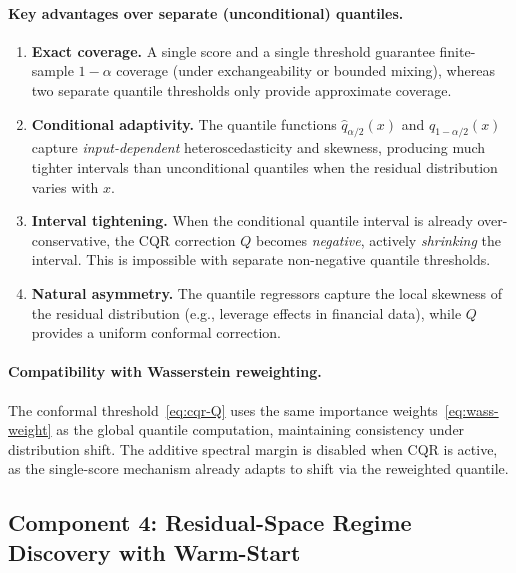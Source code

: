 \paragraph{Key advantages over separate (unconditional) quantiles.}
\begin{enumerate}
  \item \textbf{Exact coverage.}  A single score and a single threshold
    guarantee finite-sample $1-\alpha$ coverage (under exchangeability or
    bounded mixing), whereas two separate quantile thresholds only provide
    approximate coverage.
  \item \textbf{Conditional adaptivity.}  The quantile functions
    $\hat{q}_{\alpha/2}(x)$ and $\hat{q}_{1-\alpha/2}(x)$ capture
    \emph{input-dependent} heteroscedasticity and skewness, producing
    much tighter intervals than unconditional quantiles when the residual
    distribution varies with $x$.
  \item \textbf{Interval tightening.}  When the conditional quantile
    interval is already over-conservative, the CQR correction $Q$ becomes
    \emph{negative}, actively \emph{shrinking} the interval.  This is
    impossible with separate non-negative quantile thresholds.
  \item \textbf{Natural asymmetry.}  The quantile regressors capture the
    local skewness of the residual distribution (e.g., leverage effects in
    financial data), while $Q$ provides a uniform conformal correction.
\end{enumerate}

\paragraph{Compatibility with Wasserstein reweighting.}
The conformal threshold~\eqref{eq:cqr-Q} uses the same importance
weights~\eqref{eq:wass-weight} as the global quantile computation,
maintaining consistency under distribution shift.  The additive spectral
margin is disabled when CQR is active, as the single-score mechanism
already adapts to shift via the reweighted quantile.

\subsection{Component 4: Residual-Space Regime Discovery with Warm-Start}
\label{sec:residual-regime}

